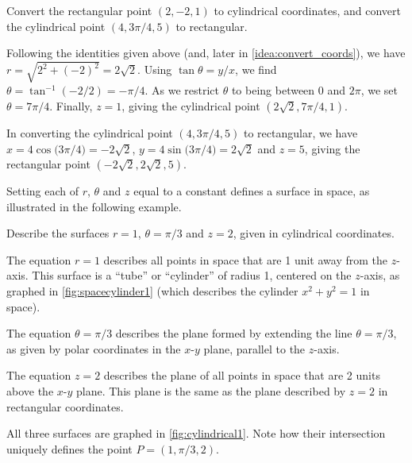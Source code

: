{Convert the rectangular point $(2,-2,1)$ to cylindrical coordinates, and convert the cylindrical point $(4,3\pi/4,5)$ to rectangular.}
{Following the identities given above (and, later in \autoref{idea:convert_coords}), we have $r = \sqrt{2^2+(-2)^2} = 2\sqrt{2}$. Using $\tan\theta = y/x$, we find $\theta = \tan^{-1}(-2/2) =-\pi/4$. As we restrict $\theta$ to being between $0$ and $2\pi$, we set $\theta = 7\pi/4$. Finally, $z = 1$, giving the cylindrical point $(2\sqrt2,7\pi/4,1)$.

In converting the cylindrical point $(4,3\pi/4,5)$ to rectangular, we have
$x = 4\cos\big(3\pi/4\big) = -2\sqrt{2}$, $y = 4\sin\big(3\pi/4\big) = 2\sqrt{2}$ and $z=5$, giving the rectangular point $(-2\sqrt{2},2\sqrt{2},5)$.}

Setting each of $r$, $\theta$ and $z$ equal to a constant defines a surface in space, as illustrated in the following example.

%
{Describe the surfaces $r=1$, $\theta = \pi/3$ and $z=2$, given in cylindrical coordinates.}
{The equation $r=1$ describes all points in space that are 1 unit away from the $z$-axis. This surface is a ``tube'' or ``cylinder'' of radius 1, centered on the $z$-axis, as graphed in \autoref{fig:spacecylinder1} (which describes the cylinder $x^2+y^2=1$ in space). 

The equation $\theta=\pi/3$ describes the plane formed by extending the line $\theta=\pi/3$, as given by polar coordinates in the $x$-$y$ plane, parallel to the $z$-axis.

The equation $z=2$ describes the plane of all points in space that are 2 units above the $x$-$y$ plane. This plane is the same as the plane described by $z=2$ in rectangular coordinates.
%

All three surfaces are graphed in \autoref{fig:cylindrical1}. Note how their intersection uniquely defines the point $P=(1,\pi/3,2)$.}

